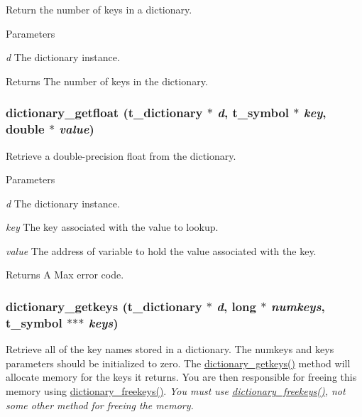 Return the number of keys in a dictionary. 
\begin{DoxyParams}{Parameters}
\item[{\em d}]The dictionary instance. \end{DoxyParams}
\begin{DoxyReturn}{Returns}
The number of keys in the dictionary. 
\end{DoxyReturn}
\hypertarget{group__dictionary_ga4e166c9edc4575ec89f176455a134cda}{
\subsubsection[{dictionary\_\-getfloat}]{ dictionary\_\-getfloat ({\bf t\_\-dictionary} $\ast$ {\em d}, \/  {\bf t\_\-symbol} $\ast$ {\em key}, \/  double $\ast$ {\em value})}}
\label{group__dictionary_ga4e166c9edc4575ec89f176455a134cda}


Retrieve a double-\/precision float from the dictionary. 
\begin{DoxyParams}{Parameters}
\item[{\em d}]The dictionary instance. \item[{\em key}]The key associated with the value to lookup. \item[{\em value}]The address of variable to hold the value associated with the key. \end{DoxyParams}
\begin{DoxyReturn}{Returns}
A Max error code. 
\end{DoxyReturn}
\hypertarget{group__dictionary_gae595d2340304018ee2b01e1288534ea3}{
\subsubsection[{dictionary\_\-getkeys}]{ dictionary\_\-getkeys ({\bf t\_\-dictionary} $\ast$ {\em d}, \/  long $\ast$ {\em numkeys}, \/  {\bf t\_\-symbol} $\ast$$\ast$$\ast$ {\em keys})}}
\label{group__dictionary_gae595d2340304018ee2b01e1288534ea3}


Retrieve all of the key names stored in a dictionary. The numkeys and keys parameters should be initialized to zero. The \hyperlink{group__dictionary_gae595d2340304018ee2b01e1288534ea3}{dictionary\_\-getkeys()} method will allocate memory for the keys it returns. You are then responsible for freeing this memory using \hyperlink{group__dictionary_ga38077c67f36917a708c4867351d6444e}{dictionary\_\-freekeys()}. {\itshape You must use \hyperlink{group__dictionary_ga38077c67f36917a708c4867351d6444e}{dictionary\_\-freekeys()}, not some other method for freeing the memory.\/}


